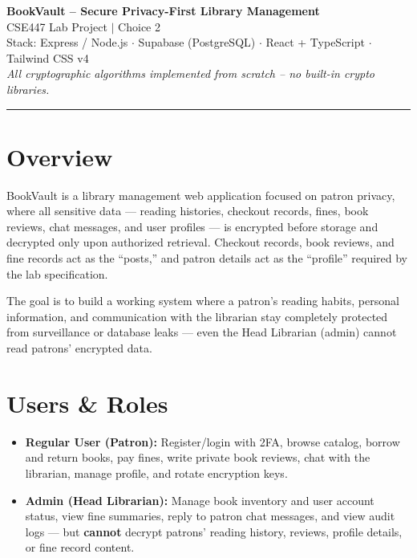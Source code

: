 \documentclass[12pt]{article}
\begin{document}
\begin{center}
    {\LARGE\bfseries BookVault -- Secure Privacy-First Library Management}\\[6pt]
    {\large CSE447 Lab Project $\mid$ Choice 2}\\[4pt]
    {\normalsize Stack: Express / Node.js $\cdot$ Supabase (PostgreSQL) $\cdot$ React + TypeScript $\cdot$ Tailwind CSS v4}\\[2pt]
    {\small\itshape All cryptographic algorithms implemented from scratch -- no built-in crypto libraries.}
\end{center}
\vspace{0.3cm}
\hrule
\vspace{0.5cm}

\section{Overview}

BookVault is a library management web application focused on patron privacy, where all sensitive data --- reading histories, checkout records, fines, book reviews, chat messages, and user profiles --- is encrypted before storage and decrypted only upon authorized retrieval. Checkout records, book reviews, and fine records act as the ``posts,'' and patron details act as the ``profile'' required by the lab specification.

The goal is to build a working system where a patron's reading habits, personal information, and communication with the librarian stay completely protected from surveillance or database leaks --- even the Head Librarian (admin) cannot read patrons' encrypted data.

\section{Users \& Roles}

\begin{itemize}[leftmargin=2cm]
    \item \textbf{Regular User (Patron):} Register/login with 2FA, browse catalog, borrow and return books, pay fines, write private book reviews, chat with the librarian, manage profile, and rotate encryption keys.
    \item \textbf{Admin (Head Librarian):} Manage book inventory and user account status, view fine summaries, reply to patron chat messages, and view audit logs --- but \textbf{cannot} decrypt patrons' reading history, reviews, profile details, or fine record content.
\end{itemize}
\end{document}
